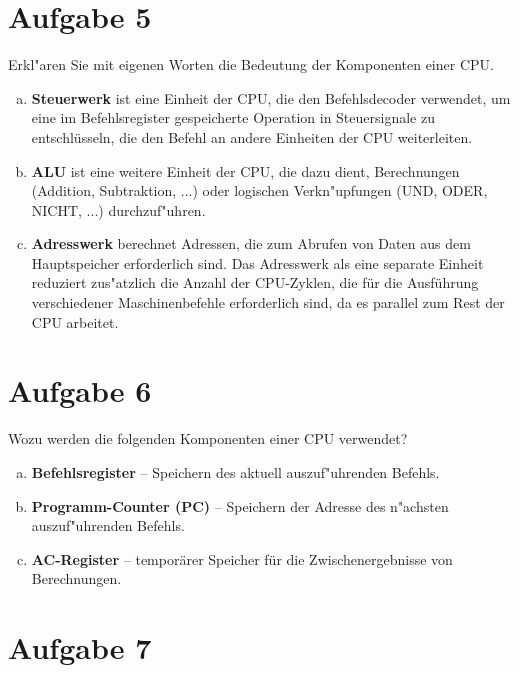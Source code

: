 \documentclass[10pt, oneside]{article}
\begin{document}
\section{Aufgabe 5}

Erkl"aren Sie mit eigenen Worten die Bedeutung der Komponenten einer CPU.

\begin{enumerate}[(a)]
    \item \textbf{Steuerwerk} ist eine Einheit der CPU, die den Befehlsdecoder verwendet,
        um eine im Befehlsregister gespeicherte Operation in
        Steuersignale zu entschlüsseln, die den Befehl an andere Einheiten der
        CPU weiterleiten.

    \item \textbf{ALU} ist eine weitere Einheit der CPU, die dazu dient, Berechnungen
        (Addition, Subtraktion, ...) oder logischen Verkn"upfungen (UND, ODER,
        NICHT, ...) durchzuf"uhren.

    \item \textbf{Adresswerk} berechnet Adressen, die zum Abrufen von Daten aus dem
        Hauptspeicher erforderlich sind. Das Adresswerk als eine separate
        Einheit reduziert zus"atzlich die Anzahl der CPU-Zyklen, die für die
        Ausführung verschiedener Maschinenbefehle erforderlich sind, da es
        parallel zum Rest der CPU arbeitet.
\end{enumerate}

\section{Aufgabe 6}

Wozu werden die folgenden Komponenten einer CPU verwendet?

\begin{enumerate}[(a)]
    \item \textbf{Befehlsregister} -- Speichern des aktuell auszuf"uhrenden
            Befehls.
    \item \textbf{Programm-Counter (PC)} -- Speichern der Adresse des n"achsten
        auszuf"uhrenden Befehls.
    \item \textbf{AC-Register} -- temporärer Speicher für die Zwischenergebnisse
        von Berechnungen.
\end{enumerate}

\section{Aufgabe 7}
\end{document}
